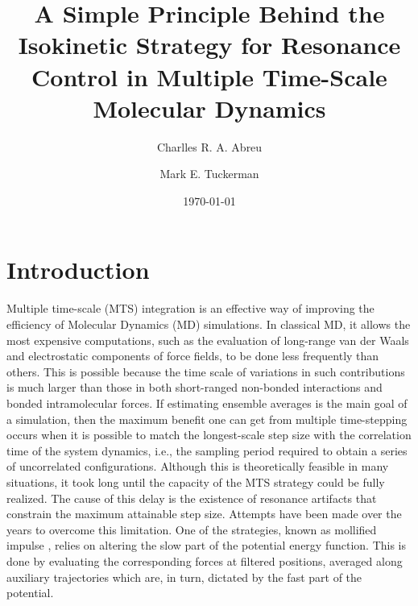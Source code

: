 \documentclass[
aip,
jcp,
reprint,
]{revtex4-1}
\begin{document}
\author{Charlles R. A. Abreu}

\author{Mark E. Tuckerman}

\title{A Simple Principle Behind the Isokinetic Strategy for Resonance Control in Multiple Time-Scale Molecular Dynamics}


\date{\today}

\maketitle

\section{Introduction}

Multiple time-scale (MTS) integration \cite{Grubmuller_1991, Tuckerman_1992, Martyna_1996} is an effective way of improving the efficiency of Molecular Dynamics (MD) simulations.
In classical MD, it allows the most expensive computations, such as the evaluation of long-range van der Waals and electrostatic components of force fields, to be done less frequently than others.
This is possible because the time scale of variations in such contributions is much larger than those in both short-ranged non-bonded interactions and bonded intramolecular forces.
If estimating ensemble averages is the main goal of a simulation, then the maximum benefit one can get from multiple time-stepping occurs when it is possible to match the longest-scale step size with the correlation time of the system dynamics, i.e., the sampling period required to obtain a series of uncorrelated configurations.
Although this is theoretically feasible in many situations, it took long until the capacity of the MTS strategy could be fully realized.
The cause of this delay is the existence of resonance artifacts \cite{Biesiadecki_1993, Schlick_1998, Ma_2003} that constrain the maximum attainable step size.
Attempts have been made over the years to overcome this limitation.
One of the strategies, known as mollified impulse \cite{Garcia-archilla_1998, Griebel_1999}, relies on altering the slow part of the potential energy function.
This is done by evaluating the corresponding forces at filtered positions, averaged along auxiliary trajectories which are, in turn, dictated by the fast part of the potential.
\end{document}
